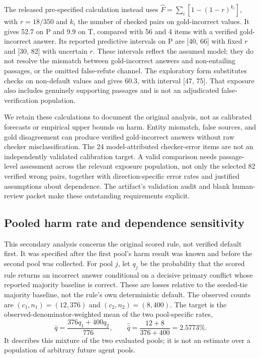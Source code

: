 The released pre-specified calculation instead uses $\hat F=\sum_i[1-(1-r)^{k_i}]$, with $r=18/350$ and $k_i$ the number of checked pairs on gold-incorrect values. It gives 52.7 on P and 9.9 on T, compared with 56 and 4 items with a verified gold-incorrect answer. Its reported predictive intervals on P are [40, 66] with fixed $r$ and [30, 82] with uncertain $r$. These intervals reflect the assumed model; they do not resolve the mismatch between gold-incorrect answers and non-entailing passages, or the omitted false-refute channel. The exploratory form substitutes checks on non-default values and gives 60.3, with interval [47, 75]. That exposure also includes genuinely supporting passages and is not an adjudicated false-verification population.

We retain these calculations to document the original analysis, not as calibrated forecasts or empirical upper bounds on harm. Entity mismatch, false sources, and gold disagreement can produce verified gold-incorrect answers without raw checker misclassification. The 24 model-attributed checker-error items are not an independently validated calibration target. A valid comparison needs passage-level assessment across the relevant exposure population, not only the selected 82 verified wrong pairs, together with direction-specific error rates and justified assumptions about dependence. The artifact's validation audit and blank human-review packet make these outstanding requirements explicit.

\subsection{Pooled harm rate and dependence sensitivity}
\label{sec:pooled-harm}

This secondary analysis concerns the original scored rule, not verified default first. It was specified after the first pool's harm result was known and before the second pool was collected. For pool $j$, let $q_j$ be the probability that the scored rule returns an incorrect answer conditional on a decisive primary conflict whose reported majority baseline is correct. These are losses relative to the seeded-tie majority baseline, not the rule's own deterministic default. The observed counts are $(c_1,n_1)=(12,376)$ and $(c_2,n_2)=(8,400)$. The target is the observed-denominator-weighted mean of the two pool-specific rates,
\[
  \bar q=\frac{376q_1+400q_2}{776},
  \qquad \widehat{\bar q}=\frac{12+8}{376+400}=2.5773\%.
\]
It describes this mixture of the two evaluated pools; it is not an estimate over a population of arbitrary future agent pools.

